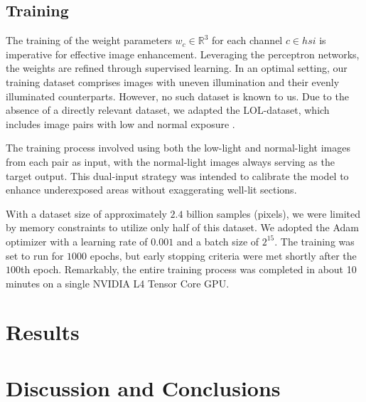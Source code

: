 \documentclass[sigconf]{acmart}
\begin{document}
\begin{mdframed}[backgroundcolor=backcolour,leftmargin=0cm,hidealllines=true,innerleftmargin=0cm,innerrightmargin=0cm,innertopmargin=0cm,innerbottommargin=-0.65cm]

\end{mdframed}

\subsection{Training}\label{sec:training}
The training of the weight parameters $w_{c} \in \mathbb{R}^3$ for each channel $c \in {hsi}$ is imperative for effective image enhancement. Leveraging the perceptron networks, the weights are refined through supervised learning. In an optimal setting, our training dataset comprises images with uneven illumination and their evenly illuminated counterparts. However, no such dataset is known to us. Due to the absence of a directly relevant dataset, we adapted the LOL-dataset, which includes image pairs with low and normal exposure \cite{wei2018deep}.

The training process involved using both the low-light and normal-light images from each pair as input, with the normal-light images always serving as the target output. This dual-input strategy was intended to calibrate the model to enhance underexposed areas without exaggerating well-lit sections.

With a dataset size of approximately $2.4$ billion samples (pixels), we were limited by memory constraints to utilize only half of this dataset. We adopted the Adam optimizer with a learning rate of $0.001$ and a batch size of $2^{15}$. The training was set to run for $1000$ epochs, but early stopping criteria were met shortly after the $100$th epoch. Remarkably, the entire training process was completed in about 10 minutes on a single NVIDIA L4 Tensor Core GPU.

\section{Results}\label{sec:results}


\section{Discussion and Conclusions}\label{sec:discussion}


\end{document}
